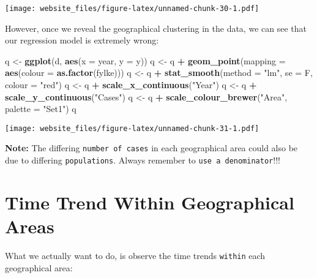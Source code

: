 \documentclass[]{book}
\newenvironment{Shaded}{\begin{snugshade}}{\end{snugshade}}
\newcommand{\KeywordTok}[1]{\textcolor[rgb]{0.13,0.29,0.53}{\textbf{#1}}}
\newcommand{\DataTypeTok}[1]{\textcolor[rgb]{0.13,0.29,0.53}{#1}}
\newcommand{\StringTok}[1]{\textcolor[rgb]{0.31,0.60,0.02}{#1}}
\newcommand{\OperatorTok}[1]{\textcolor[rgb]{0.81,0.36,0.00}{\textbf{#1}}}
\newcommand{\NormalTok}[1]{#1}
\begin{document}
\texttt{[image: website\_files/figure-latex/unnamed-chunk-30-1.pdf]}

However, once we reveal the geographical clustering in the data, we can
see that our regression model is extremely wrong:

\begin{Shaded}
\begin{Highlighting}[]
\NormalTok{q <-}\StringTok{ }\KeywordTok{ggplot}\NormalTok{(d, }\KeywordTok{aes}\NormalTok{(}\DataTypeTok{x =}\NormalTok{ year, }\DataTypeTok{y =}\NormalTok{ y))}
\NormalTok{q <-}\StringTok{ }\NormalTok{q }\OperatorTok{+}\StringTok{ }\KeywordTok{geom_point}\NormalTok{(}\DataTypeTok{mapping =} \KeywordTok{aes}\NormalTok{(}\DataTypeTok{colour =} \KeywordTok{as.factor}\NormalTok{(fylke)))}
\NormalTok{q <-}\StringTok{ }\NormalTok{q }\OperatorTok{+}\StringTok{ }\KeywordTok{stat_smooth}\NormalTok{(}\DataTypeTok{method =} \StringTok{"lm"}\NormalTok{, }\DataTypeTok{se =}\NormalTok{ F, }\DataTypeTok{colour =} \StringTok{"red"}\NormalTok{)}
\NormalTok{q <-}\StringTok{ }\NormalTok{q }\OperatorTok{+}\StringTok{ }\KeywordTok{scale_x_continuous}\NormalTok{(}\StringTok{"Year"}\NormalTok{)}
\NormalTok{q <-}\StringTok{ }\NormalTok{q }\OperatorTok{+}\StringTok{ }\KeywordTok{scale_y_continuous}\NormalTok{(}\StringTok{"Cases"}\NormalTok{)}
\NormalTok{q <-}\StringTok{ }\NormalTok{q }\OperatorTok{+}\StringTok{ }\KeywordTok{scale_colour_brewer}\NormalTok{(}\StringTok{"Area"}\NormalTok{, }\DataTypeTok{palette =} \StringTok{"Set1"}\NormalTok{)}
\NormalTok{q}
\end{Highlighting}
\end{Shaded}

\texttt{[image: website\_files/figure-latex/unnamed-chunk-31-1.pdf]}

\textbf{Note:} The differing \texttt{number\ of\ cases} in each
geographical area could also be due to differing \texttt{populations}.
Always remember to \texttt{use\ a\ denominator}!!!

\section{Time Trend Within Geographical
Areas}\label{time-trend-within-geographical-areas}

What we actually want to do, is observe the time trends \texttt{within}
each geographical area:
\end{document}
